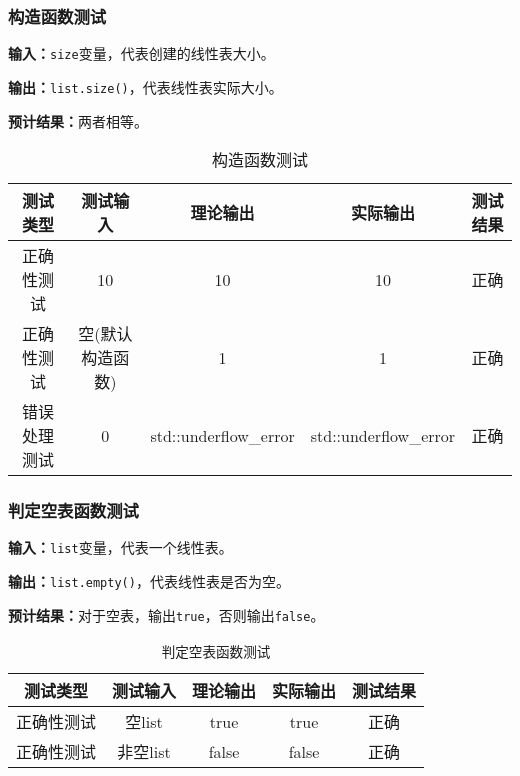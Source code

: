 \subsubsection{构造函数测试}
\textbf{输入：}\texttt{size}变量，代表创建的线性表大小。
\par
\textbf{输出：}\texttt{list.size()}，代表线性表实际大小。
\par
\textbf{预计结果：}两者相等。
\begin{table}[h]
\centering
\caption{构造函数测试}
\begin{tabular}{@{}ccccc@{}}
\toprule
\multicolumn{1}{c}{测试类型}    & \multicolumn{1}{c}{测试输入} & \multicolumn{1}{c}{理论输出} & \multicolumn{1}{c}{实际输出} & \multicolumn{1}{c}{测试结果} \\ \midrule
\multicolumn{1}{c|}{正确性测试}  & 10&10&10&正确\\
\multicolumn{1}{c|}{正确性测试}  & 空(默认构造函数)&1&1&正确\\
\multicolumn{1}{c|}{错误处理测试} & 0& std::underflow\_error& std::underflow\_error& 正确\\ \bottomrule
\end{tabular}
\label{tab:inittest2}
\end{table}

\subsubsection{判定空表函数测试}
\textbf{输入：}\texttt{list}变量，代表一个线性表。
\par
\textbf{输出：}\texttt{list.empty()}，代表线性表是否为空。
\par
\textbf{预计结果：}对于空表，输出\texttt{true}，否则输出\texttt{false}。
\begin{table}[h]
\centering
    \caption{\texttt{判定空表函数测试}}
\begin{tabular}{@{}ccccc@{}}
\toprule
\multicolumn{1}{c}{测试类型}    & \multicolumn{1}{c}{测试输入} & \multicolumn{1}{c}{理论输出} & \multicolumn{1}{c}{实际输出} & \multicolumn{1}{c}{测试结果} \\ \midrule
\multicolumn{1}{c|}{正确性测试}  & 空list&true&true&正确\\
\multicolumn{1}{c|}{正确性测试}  & 非空list&false&false&正确\\ \bottomrule
\end{tabular}
\label{tab:emptytest2}
\end{table}


